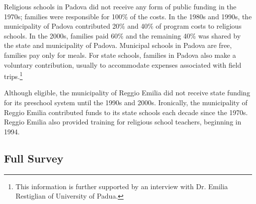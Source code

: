 Religious schools in Padova did not receive any form of public funding in the 1970s; families were responsible for 100\% of the costs. In the 1980s and 1990s, the municipality of Padova contributed 20\% and 40\% of program costs to religious schools. In the 2000s, families paid 60\% and the remaining 40\% was shared by the state and municipality of Padova. Municipal schools in Padova are free, families pay only for meals. For state schools, families in Padova also make a voluntary contribution, usually to accommodate expenses associated with field trips.\footnote{This information is further supported by an interview with Dr. Emilia Restiglian of University of Padua.}  
 
Although eligible, the municipality of Reggio Emilia did not receive state funding for its preschool system until the 1990s and 2000s. Ironically, the municipality of Reggio Emilia contributed funds to its state schools each decade since the 1970s. Reggio Emilia also provided training for religious school teachers, beginning in 1994.  

\subsection{Full Survey}

